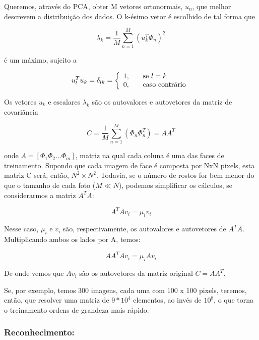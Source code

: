 \documentclass[10pt,a4paper]{article}
\begin{document}
Queremos, através do PCA, obter M vetores ortonormais, $u_n$, que melhor descrevem a distribuição dos dados. O k-ésimo vetor é escolhido de tal forma que

\begin{equation}
  \lambda_{k}=\frac{1}{M}\sum_{n=1}^{M}(u_k^T\Phi_n)^2
\end{equation}

é um máximo, sujeito a

\begin{equation}
  u_l^Tu_k=\delta_{lk}=\left \{
    \begin{array}{l l}
      1, & \quad \text{se $l=k$} \\
      0, & \quad \text{caso contrário}\\
    \end{array}
  \right.
\end{equation}

Os vetores $u_k$ e escalares $\lambda_k$ são os autovalores e autovetores da matriz de covariância

\begin{equation}
  C=\frac{1}{M}\sum_{n=1}^{M}(\Phi_n\Phi_n^T)= AA^T
\end{equation}

onde $A = [ \Phi_1 \Phi_2 \ldots \Phi_m ]$, matriz na qual cada coluna é uma das faces de treinamento. Supondo que cada imagem de face é composta por NxN pixels, esta matriz C será, então, $N^2 \times N^2$. Todavia, se o número de rostos for bem menor do que o tamanho de cada foto ($M \ll N$), podemos simplificar os cálculos, se considerarmos a matriz $A^TA$:

\begin{equation}
  A^TAv_i=\mu_iv_i
\end{equation}

Nesse caso, $\mu_i$ e $v_i$ são, respectivamente, os autovalores e autovetores de $A^TA$. Multiplicando ambos os lados por A, temos:

\begin{equation}
  AA^TAv_i=\mu_iAv_i
\end{equation}

De onde vemos que $Av_i$ são os autovetores da matriz original $C = AA^T$.

Se, por exemplo, temos 300 imagens, cada uma com 100 x 100 pixels, teremos, então, que resolver uma matriz de $9*10^4$ elementos, ao invés de $10^8$, o que torna o treinamento ordens de grandeza mais rápido.

\subsubsection*{Reconhecimento:}
\end{document}
